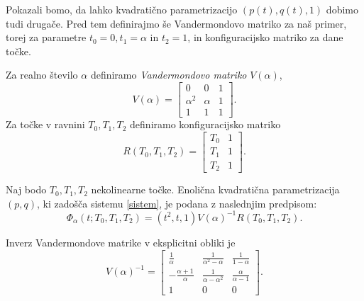\documentclass[mat1]{fmfdelo}
\newcommand{\al}{\alpha}
\begin{document}
Pokazali bomo, da lahko kvadratično parametrizacijo $(p(t), q(t),1)$ dobimo tudi drugače. Pred tem definirajmo še Vandermondovo matriko za naš primer, torej za parametre $t_0 = 0, t_1 = \al$ in $t_2 = 1$, in konfiguracijsko matriko za dane točke.

\begin{definicija}
Za realno število $\al$ definiramo \emph{Vandermondovo matriko} $V(\al)$,
$$V(\al) = 
\begin{bmatrix}
0 & 0 & 1 \\
\al ^2 & \al & 1 \\
1 & 1 & 1
\end{bmatrix}
.$$
Za točke v ravnini $T_0, T_1, T_2$ definiramo konfiguracijsko matriko
$$R(T_0, T_1, T_2) = 
\begin{bmatrix}
T_0 & 1 \\
T_1 & 1 \\
T_2 & 1
\end{bmatrix}
.$$
\end{definicija}


\begin{trditev}\label{parametrizacija}
Naj bodo $T_0, T_1, T_2$  nekolinearne točke. Enolična kvadratična parametrizacija $(p, q)$, ki zadošča sistemu \eqref{sistem}, je podana z naslednjim predpisom:
$$ \Phi_\al(t; T_0, T_1, T_2) = (t^2, t, 1) V(\al)^{-1} R(T_0, T_1, T_2).$$
\end{trditev}


\begin{opomba}
Inverz Vandermondove matrike v eksplicitni obliki je
$$
V(\al)^{-1} = 
\begin{bmatrix}
\frac{1}{\al} & \frac{1}{\al^2 - \al} & \frac{1}{1-\al} \\
- \frac{\al + 1}{\al} & \frac{1}{\al - \al^2} & \frac{\al}{\al-1} \\
1 & 0 & 0
\end{bmatrix}
.$$
\end{opomba}
\end{document}
